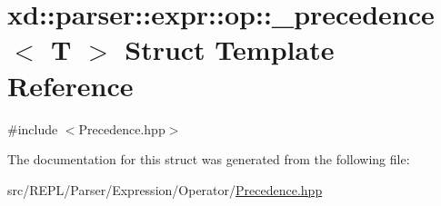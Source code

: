 \hypertarget{structxd_1_1parser_1_1expr_1_1op_1_1__precedence}{}\section{xd\+:\+:parser\+:\+:expr\+:\+:op\+:\+:\+\_\+precedence$<$ T $>$ Struct Template Reference}
\label{structxd_1_1parser_1_1expr_1_1op_1_1__precedence}


{\ttfamily \#include $<$Precedence.\+hpp$>$}



The documentation for this struct was generated from the following file\+:\begin{DoxyCompactItemize}
\item 
src/\+R\+E\+P\+L/\+Parser/\+Expression/\+Operator/\mbox{\hyperlink{_precedence_8hpp}{Precedence.\+hpp}}\end{DoxyCompactItemize}
